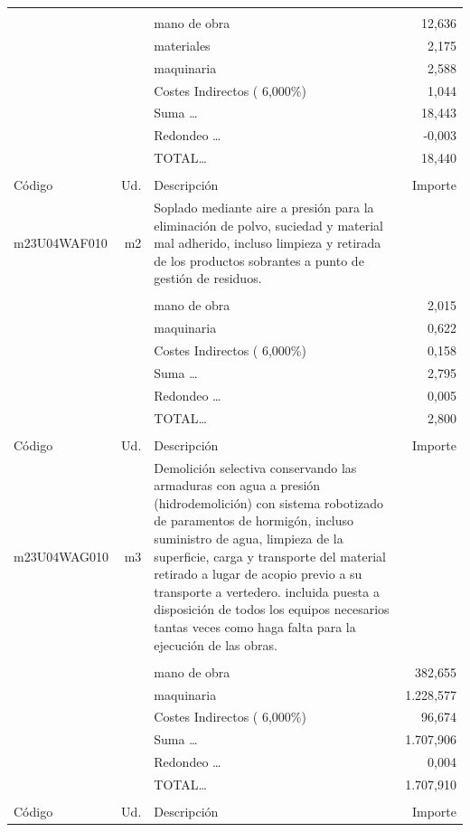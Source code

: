 \documentclass{book}%
\begin{document}
\begin{supertabular}{l r p{60mm} r}
&&&\\%
&&mano de obra&    12,636\\%
&&materiales&     2,175\\%
&&maquinaria&     2,588\\%
&&Costes Indirectos (     6,000\%)&     1,044\\%
&&Suma \ldots&    18,443\\%
&&Redondeo \ldots&    {-}0,003\\%
%
&&TOTAL\ldots&    18,440\\%
&&&\\%
Código&Ud.&Descripción&Importe\\%
\hline%
m23U04WAF010&m2&Soplado mediante aire a presión para la eliminación de polvo, suciedad y material mal adherido, incluso limpieza y retirada de los productos sobrantes a punto de gestión de residuos.&\\%
&&&\\%
&&mano de obra&     2,015\\%
&&maquinaria&     0,622\\%
&&Costes Indirectos (     6,000\%)&     0,158\\%
&&Suma \ldots&     2,795\\%
&&Redondeo \ldots&     0,005\\%
%
&&TOTAL\ldots&     2,800\\%
&&&\\%
Código&Ud.&Descripción&Importe\\%
\hline%
m23U04WAG010&m3&Demolición selectiva conservando las armaduras con agua a presión (hidrodemolición) con sistema robotizado de paramentos de hormigón, incluso suministro de agua, limpieza de la superficie, carga y transporte del material retirado a lugar de acopio previo a su transporte a vertedero. incluida puesta a disposición de todos los equipos necesarios tantas veces como haga falta para la ejecución de las obras.&\\%
&&&\\%
&&mano de obra&   382,655\\%
&&maquinaria& 1.228,577\\%
&&Costes Indirectos (     6,000\%)&    96,674\\%
&&Suma \ldots& 1.707,906\\%
&&Redondeo \ldots&     0,004\\%
%
&&TOTAL\ldots& 1.707,910\\%
&&&\\%
Código&Ud.&Descripción&Importe\\%

\end{supertabular}
\end{document}
